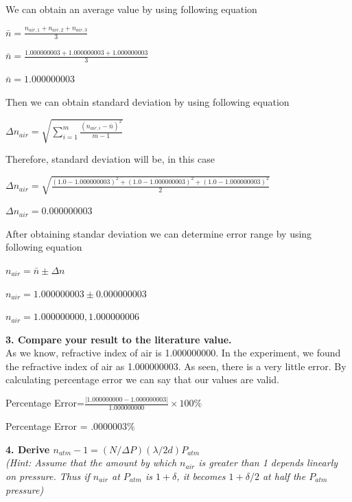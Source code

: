 \documentclass[a4paper,12pt]{report}
\begin{document}
We can obtain an average value by using following equation
\begin{center}
	$\bar{n}=\frac{n_{air,1}+n_{air,2}+n_{air,3}}{3}$
\end{center}
\begin{center}
	$\bar{n}=\frac{1.000000003+1.000000003+1.000000003}{3}$
\end{center}
\begin{center}
	$\bar{n}=1.000000003$
\end{center}
Then we can obtain standard deviation by using following equation
\begin{center}
	{\Large $\Delta n_{air}=\sqrt{\sum_{i=1}^{m}\frac{(n_{air,i}-\bar{n})^{2}}{m-1}}$}
\end{center}
Therefore, standard deviation will be, in this case
\begin{center}
	{\large $\Delta n_{air}=\sqrt{\frac{(1.0-1.000000003)^{2}+(1.0-1.000000003)^{2}+(1.0-1.000000003)^{2}}{2}}$}
\end{center}
\begin{center}
	{\large $\Delta n_{air}=0.000000003$}
\end{center}
After obtaining standar deviation we can determine error range by using following equation
\begin{center}
	$n_{air}=\bar{n}\pm\Delta n$
\end{center}
\begin{center}
	$n_{air}=1.000000003\pm 0.000000003$
\end{center}
\begin{center}
	$n_{air}=1.000000000, 1.000000006$
\end{center}
\textbf{3. Compare your result to the literature value.}\\
As we know, refractive index of air is 1.000000000. In the experiment, we found the refractive index of air as 1.000000003. As seen, there is a very little error. By calculating percentage error we can say that our values are valid.
\begin{center}
	Percentage Error=$\frac{|1.000000000-1.000000003|}{1.000000000}\times100\%$
\end{center}
\begin{center}
	Percentage Error = .0000003$\%$
\end{center}
\textbf{4. Derive $n_{atm}-1=(N/\Delta P)(\lambda/2d)P_{atm}$}\\
\textit{(Hint: Assume that the amount by which $n_{air}$ is greater than 1 depends linearly on pressure. Thus if $n_{air}$ at $P_{atm}$ is $1+\delta$, it becomes $1+\delta/2$ at half the $P_{atm}$ pressure)}\\
\end{document}
